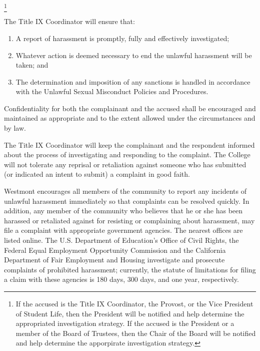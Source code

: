 			\footnote{

				If the accused is the Title IX Coordinator, the Provost, or the Vice
				President of Student Life, then the President will be
				notified and help determine the appropriated investigation
				strategy. If the accused is the President or a member of the
				Board of Trustees, then the Chair of the Board will be notified
				and help determine the apporpirate investigation strategy.

			}


			\quad The Title IX Coordinator will ensure that:
			\begin{enumerate}[label=\alph*)]
				\item{ A report of harassment is promptly, fully and effectively
					investigated; }

				\item{ Whatever action is deemed necessary to end the unlawful
					harassment will be taken; and }

				\item{ The determination and imposition of any sanctions is handled
					in accordance with the Unlawful Sexual Misconduct Policies and Procedures.
				}

			\end{enumerate}

			\quad Confidentiality for both the complainant and the accused shall
			be encouraged and maintained as appropriate and to the extent
			allowed under the circumstances and by law.

			\quad The Title IX Coordinator will keep the complainant and the
			respondent informed about the process of investigating and
			responding to the complaint.  The College will not tolerate any
			reprisal or retaliation against someone who has submitted (or
			indicated an intent to submit) a complaint in good faith.

			\quad Westmont encourages all members of the community to report any
			incidents of unlawful harassment immediately so that complaints can
			be resolved quickly.  In addition, any member of the community who
			believes that he or she has been harassed or retaliated against for
			resisting or complaining about harassment, may file a complaint with
			appropriate government agencies.  The nearest offices are listed online.
			The U.S. Department of Education's Office
			of Civil Rights, the Federal Equal Employment Opportunity Commission
			and the California Department of Fair Employment and Housing
			investigate and prosecute complaints of prohibited harassment;
			currently, the statute of limitations for filing a claim with these
			agencies is 180 days, 300 days, and one year, respectively.

